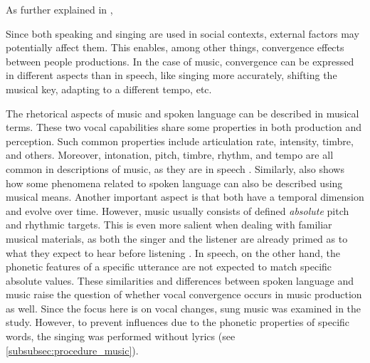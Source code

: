 As further explained in \citet{Raveh2020SpeechProsody}, 



Since both speaking and singing are used in social contexts, external factors may potentially affect them.
This enables, among other things, convergence effects between people productions.
In the case of music, convergence can be expressed in different aspects than in speech, like singing more accurately, shifting the musical key, adapting to a different tempo, etc.

The rhetorical aspects of music and spoken language can be described in musical terms.
These two vocal capabilities share some properties in both production and perception.
Such common properties include articulation rate, intensity, timbre, and others.
Moreover, intonation, pitch, timbre, rhythm, and tempo are all common in descriptions of music, as they are in speech \citep{Molino2000toward, Jackendoff2009parallels}.
Similarly, \citet{Day2013speech} also shows how some phenomena related to spoken language can also be described using musical means.
Another important aspect is that both have a temporal dimension and evolve over time.
However, music usually consists of defined \emph{absolute} pitch and rhythmic targets.
This is even more salient when dealing with familiar musical materials, as both the singer and the listener are already primed as to what they expect to hear before listening \citep{Meyer2008emotion}.
In speech, on the other hand, the phonetic features of a specific utterance are not expected to match specific absolute values.
These similarities and differences between spoken language and music raise the question of whether vocal convergence occurs in music production as well.
Since the focus here is on vocal changes, sung music was examined in the study.
However, to prevent influences due to the phonetic properties of specific words, the singing was performed without lyrics (see \cref{subsubsec:procedure_music}).

